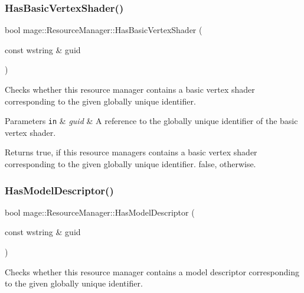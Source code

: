 \subsubsection{\texorpdfstring{Has\+Basic\+Vertex\+Shader()}{HasBasicVertexShader()}}
{\footnotesize\ttfamily bool mage\+::\+Resource\+Manager\+::\+Has\+Basic\+Vertex\+Shader (\begin{DoxyParamCaption}\item[{const wstring \&}]{guid }\end{DoxyParamCaption})\hspace{0.3cm}{\ttfamily [noexcept]}}

Checks whether this resource manager contains a basic vertex shader corresponding to the given globally unique identifier.


\begin{DoxyParams}[1]{Parameters}
\mbox{\tt in}  & {\em guid} & A reference to the globally unique identifier of the basic vertex shader. \\
\hline
\end{DoxyParams}
\begin{DoxyReturn}{Returns}
{\ttfamily true}, if this resource managers contains a basic vertex shader corresponding to the given globally unique identifier. {\ttfamily false}, otherwise. 
\end{DoxyReturn}
\hypertarget{classmage_1_1_resource_manager_a20913b24e2b86b3c59887f6b071bb020}{}\label{classmage_1_1_resource_manager_a20913b24e2b86b3c59887f6b071bb020} 
\subsubsection{\texorpdfstring{Has\+Model\+Descriptor()}{HasModelDescriptor()}}
{\footnotesize\ttfamily bool mage\+::\+Resource\+Manager\+::\+Has\+Model\+Descriptor (\begin{DoxyParamCaption}\item[{const wstring \&}]{guid }\end{DoxyParamCaption})\hspace{0.3cm}{\ttfamily [noexcept]}}

Checks whether this resource manager contains a model descriptor corresponding to the given globally unique identifier.


